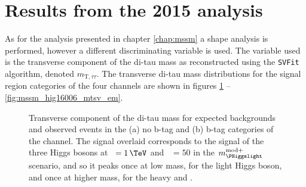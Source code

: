 \section{Results from the 2015 analysis}
\label{sec:mssm_combination_2015}
As for the analysis presented in 
chapter \ref{chap:mssm} a shape analysis is performed, however a different
discriminating variable is used. The variable used is the transverse component of the di-tau mass
as reconstructed using the \texttt{SVFit} algorithm, 
denoted $m_{\text{T},\tau\tau}$. The transverse di-tau mass 
distributions for the signal region categories of the four channels are shown in figures \ref{fig:mssm_hig16006_mtsv_mt} -- \ref{fig:mssm_hig16006_mtsv_em}.
\begin{figure}[h!]
\begin{center}
\end{center}
\caption[Transverse component of the di-tau mass for expected backgrounds
and observed events in the no b-tag and b-tag categories of the \mutau channel.]{Transverse component of the di-tau mass for expected backgrounds and
observed events in the (a) no b-tag and (b) b-tag categories of the \mutau channel.
The signal overlaid corresponds to the signal of the three Higgs bosons at \mA~$=1\,\TeV$ and \tanb~$=50$
in the $m_{\text{\PHiggslight}}^{\text{mod+}}$ scenario, and so it peaks once at low mass, for the light Higgs boson,
and once at higher mass, for the heavy \PHiggs and \PHiggsps.}
\label{fig:mssm_hig16006_mtsv_mt}
\end{figure}

